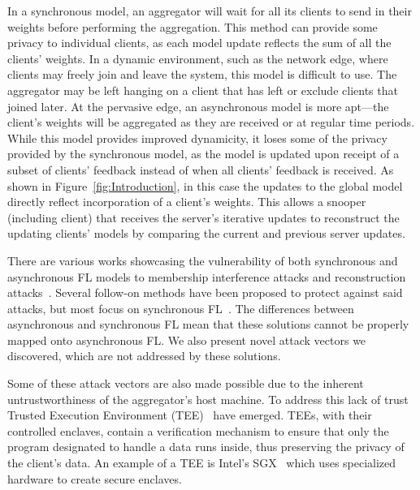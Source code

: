In a synchronous model, an aggregator will wait for all its clients to send in their weights before performing the aggregation. 
This method can provide some privacy to individual clients, as each model update reflects the sum of all the clients' weights.  
In a dynamic environment, such as the network edge, where clients may freely join and leave the system, this model is difficult to use. The aggregator may be left hanging on a client that has left or exclude clients that joined later. At the pervasive edge, an asynchronous model is more apt---the client’s weights will be aggregated as they are received or at regular time periods. While this model provides improved dynamicity, it loses some of the privacy provided by the synchronous model, as the model is updated upon receipt of a subset of clients' feedback instead of when all clients' feedback is received. As shown in Figure~\ref{fig:Introduction}, in this case the updates to the global model directly reflect incorporation of a client's weights. This allows a snooper (including client) that receives the server's iterative updates to reconstruct the updating clients' models by comparing the current and previous server updates. %

There are various works showcasing the vulnerability of both synchronous and asynchronous FL models to membership interference attacks and reconstruction attacks~\cite{nasshohou2019comprehensive,zhuLiGu2024evaluating,shostrmarc2017membership,yanGeXia2023using, BoeDziSchu2023when, ZhaShaElk2024Large-scale}. Several follow-on methods have been proposed to protect against said attacks, but most focus on synchronous FL~\cite{ShoRezShm2015Privacy,weilima2023personalized,Hewancai2024clustered,HuGuoGon2023Federated,xuliliu2020verifynet,NaHyeJun2022Closing,liuligao2023privacy-encoded,Caozhazha2024SRFL}. The differences between asynchronous and synchronous FL mean that these solutions cannot be properly mapped onto asynchronous FL. We  also present novel attack vectors we discovered, which are not addressed by these solutions. 

Some of these attack vectors are also made possible due to the inherent untrustworthiness of the aggregator's host machine. To address this lack of trust Trusted Execution Environment (TEE)~\cite{IEECiteforSGX, TEECite} have emerged. TEEs, with their controlled enclaves, contain a verification mechanism to ensure that only the program designated to handle a data runs inside, thus preserving the privacy of the client's data. An example of a TEE is Intel's SGX~\cite{IEECiteforSGX} which uses specialized hardware to create secure enclaves. 

